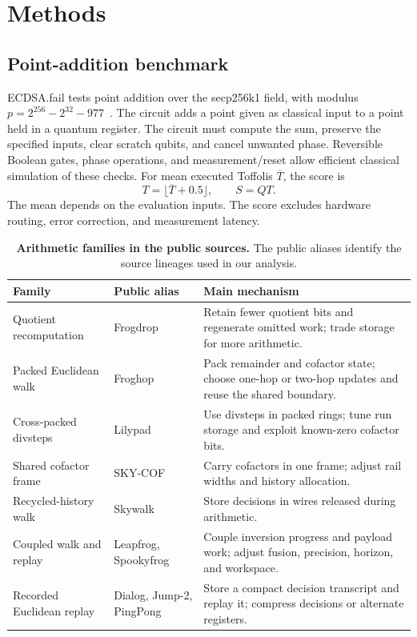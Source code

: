 \documentclass[aps,prx,reprint,raggedbottom,superscriptaddress,longbibliography,floatfix]{revtex4-2}
\begin{document}
\section{Methods}
\subsection{Point-addition benchmark}
ECDSA.fail tests point addition over the secp256k1 field, with modulus $p=2^{256}-2^{32}-977$~\cite{openauto}.
The circuit adds a point given as classical input to a point held in a quantum register.
The circuit must compute the sum, preserve the specified inputs, clear scratch qubits, and cancel unwanted phase.
Reversible Boolean gates, phase operations, and measurement/reset allow efficient classical simulation of these checks.
For mean executed Toffolis $\overline{T}$, the score is
\begin{equation}
T=\lfloor\overline{T}+0.5\rfloor,\qquad S=QT.
\end{equation}
The mean depends on the evaluation inputs.
The score excludes hardware routing, error correction, and measurement latency.

\begin{table}[!tp]
\caption{\textbf{Arithmetic families in the public sources.}
The public aliases identify the source lineages used in our analysis.}
\label{tab:families}
\centering\small
\begin{tabular}{p{}p{}p{}}
\toprule
Family & Public alias & Main mechanism \\
\midrule
Quotient recomputation & Frogdrop & Retain fewer quotient bits and regenerate omitted work; trade storage for more arithmetic. \\
Packed Euclidean walk & Froghop & Pack remainder and cofactor state; choose one-hop or two-hop updates and reuse the shared boundary. \\
Cross-packed divsteps & Lilypad & Use divsteps in packed rings; tune run storage and exploit known-zero cofactor bits. \\
Shared cofactor frame & SKY-COF & Carry cofactors in one frame; adjust rail widths and history allocation. \\
Recycled-history walk & Skywalk & Store decisions in wires released during arithmetic. \\
Coupled walk and replay & Leapfrog, Spookyfrog & Couple inversion progress and payload work; adjust fusion, precision, horizon, and workspace. \\
Recorded Euclidean replay & Dialog, Jump-2, PingPong & Store a compact decision transcript and replay it; compress decisions or alternate registers. \\
\bottomrule
\end{tabular}
\end{table}
\end{document}
